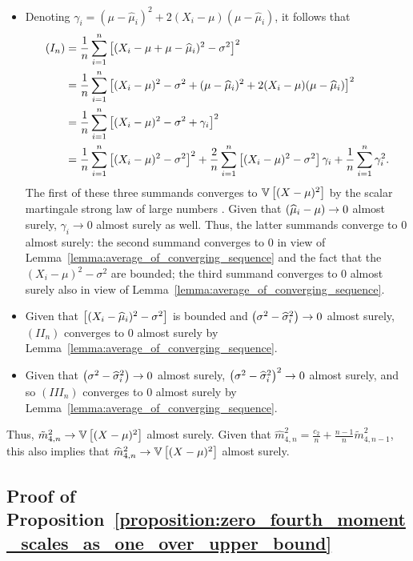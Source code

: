     \begin{itemize}
        \item Denoting $\gamma_i = (\mu - \widehat\mu_i)^2 + 2(X_i - \mu)(\mu - \widehat\mu_i)$, it follows that 
        \begin{align*}
            (I_n) &= \frac{1}{n} \sum_{i = 1}^n \left[ (X_i - \mu + \mu - \widehat\mu_i)^2 - \sigma^2 \right]^2
            \\&= \frac{1}{n} \sum_{i = 1}^n \left[ (X_i - \mu)^2  - \sigma^2 + (\mu - \widehat\mu_i)^2 + 2(X_i - \mu)(\mu - \widehat\mu_i)\right]^2
            \\&= \frac{1}{n} \sum_{i = 1}^n \left[ (X_i - \mu)^2  - \sigma^2 +\gamma_i\right]^2
            \\&= \frac{1}{n} \sum_{i = 1}^n \left[ (X_i - \mu)^2  - \sigma^2\right]^2 + \frac{2}{n} \sum_{i = 1}^n \left[ (X_i - \mu)^2  - \sigma^2\right] \gamma_i + \frac{1}{n} \sum_{i = 1}^n \gamma_i^2.
        \end{align*}
        The first of these three summands converges to $\mathbb{V} \left[(X-\mu)^2 \right]$ by the scalar martingale strong law of large numbers \citep[Theorem 2.1]{hall2014martingale}. 
        Given that $\left( \widehat\mu_i - \mu \right)\to0$ almost surely, $\gamma_i\to0$ almost surely as well. Thus, the latter summands converge to $0$ almost surely: the second summand converges to $0$ in view of Lemma~\ref{lemma:average_of_converging_sequence} and the fact that the $(X_i - \mu)^2  - \sigma^2$ are bounded; the third summand converges to $0$ almost surely also in view of Lemma~\ref{lemma:average_of_converging_sequence}. 
        
        
        \item Given that $\left[ (X_i - \widehat\mu_i)^2 - \sigma^2 \right]$ is bounded and $\left( \sigma^2 - \widehat\sigma_i^2 \right)\to0$ almost surely, $(II_n)$ converges to $0$ almost surely by Lemma~\ref{lemma:average_of_converging_sequence}.
        \item Given that  $\left( \sigma^2 - \widehat\sigma_i^2 \right)\to0$ almost surely, $\left( \sigma^2 - \widehat\sigma_i^2 \right)^2\to0$ almost surely, and so $(III_n)$ converges to $0$ almost surely by Lemma~\ref{lemma:average_of_converging_sequence}.
    \end{itemize}
    Thus,  $\tilde m_{4, n}^2 \to \mathbb{V} \left[(X-\mu)^2 \right]$ almost surely. Given that $\widehat m_{4, n}^2 = \frac{c_2}{n} + \frac{n-1}{n}\tilde m_{4, n-1}^2$, this also implies that $\widehat m_{4, n}^2 \to \mathbb{V} \left[(X-\mu)^2 \right]$ almost surely.
    

\subsection{Proof of Proposition~\ref{proposition:zero_fourth_moment_scales_as_one_over_upper_bound}} \label{proof:zero_fourth_moment_scales_as_one_over_upper_bound}

